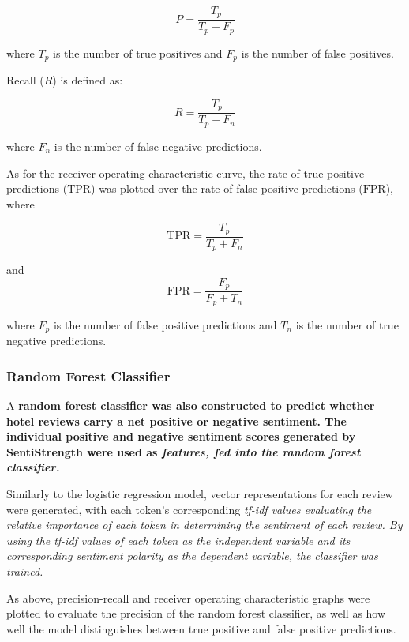 \documentclass[12pt,bibliography=totocnumbered]{scrartcl}
\begin{document}
\begin{equation}
	P = \frac{T_p}{T_p + F_p}
	\label{eq:prec}
\end{equation}

where $T_p$ is the number of true positives and $F_p$ is the number of false positives.

Recall ($R$) is defined as:

\begin{equation}
	R = \frac{T_p}{T_p + F_n}
	\label{eq:recall}
\end{equation}

where $F_n$ is the number of false negative predictions.

As for the receiver operating characteristic curve, the rate 
of true positive predictions ($\text{TPR}$) was plotted over the rate of 
false positive predictions ($\text{FPR}$), where

\begin{equation}
	\text{TPR} = \frac{T_p}{T_p + F_n}
	\label{eq:TPR}
\end{equation}

and 
\begin{equation}
	\text{FPR} = \frac{F_p}{F_p + T_n}
	\label{eq:FPR}
\end{equation}

where $F_p$ is the number of false positive predictions
and $T_n$ is the number of true negative predictions.

\subsubsection{Random Forest Classifier}
A \bf{random forest classifier} was also constructed
to predict whether hotel reviews carry a net positive or
negative sentiment. The individual positive and negative sentiment
scores generated by SentiStrength were used as \it{features},
fed into the random forest classifier.

Similarly to the logistic regression model,
vector representations for each review were generated,
with each token's corresponding \it{tf-idf} values evaluating the
relative importance of each token in determining the sentiment
of each review. By using the \it{tf-idf} values of each token as
the independent variable and its corresponding sentiment polarity
as the dependent variable, the classifier was trained.

As above, precision-recall and receiver operating characteristic
graphs were plotted to evaluate the precision of the random forest
classifier, as well as how well the model distinguishes between true
positive and false positive predictions.
\end{document}
